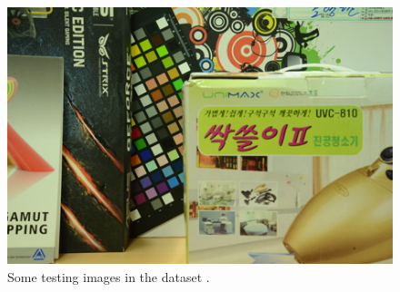 \documentclass[10pt,twocolumn,letterpaper]{article}
\begin{document}
\begin{figure}[t]
{\begin{minipage}{0.15\textwidth}
\end{minipage}
\begin{minipage}{0.15\textwidth}
\includegraphics[width=1\textwidth]{images/resize_CC_Mean_Nikon_D800_ISO_6400_B1.png}
\end{minipage}
}
\caption{Some testing images in the dataset \cite{crosschannel2016}.}
\label{fig5}
\end{figure}
\end{document}
